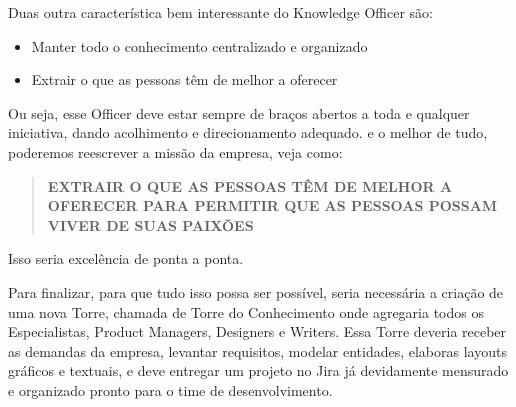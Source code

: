 Duas outra característica bem interessante do Knowledge Officer são: 
\begin{itemize}
    \item Manter todo o conhecimento centralizado e organizado
    \item Extrair o que as pessoas têm de melhor a oferecer
\end{itemize}
Ou seja, esse Officer deve estar sempre de braços abertos a toda e qualquer iniciativa, dando acolhimento e direcionamento adequado. e o melhor de tudo, poderemos reescrever a missão da empresa, veja como:
\begin{quote}
    \textbf{EXTRAIR O QUE AS PESSOAS TÊM DE MELHOR A OFERECER PARA
    PERMITIR QUE AS PESSOAS POSSAM VIVER DE SUAS PAIXÕES}
\end{quote}

Isso seria excelência de ponta a ponta.

Para finalizar, para que tudo isso possa ser possível, seria necessária a criação de uma nova Torre, chamada de Torre do Conhecimento onde agregaria todos os Especialistas, Product Managers, Designers e Writers.
Essa Torre deveria receber as demandas da empresa, levantar requisitos, modelar entidades, elaboras layouts gráficos e textuais, e deve entregar um projeto no Jira já devidamente mensurado e organizado pronto para o time de desenvolvimento.
